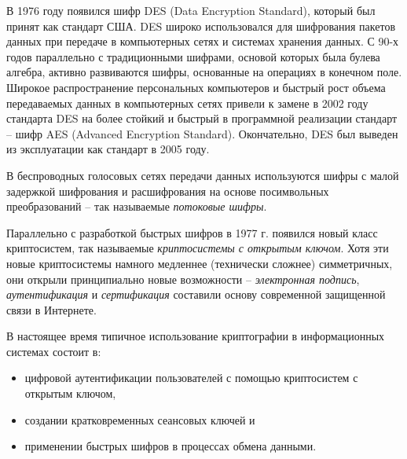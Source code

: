 В 1976 году появился шифр DES (Data Encryption Standard), который был принят как стандарт США. DES широко использовался для шифрования пакетов данных при передаче в компьютерных сетях и системах хранения данных. С 90-х годов параллельно с традиционными шифрами, основой которых была булева алгебра, активно развиваются шифры, основанные на операциях в конечном поле. Широкое распространение персональных компьютеров и быстрый рост объема передаваемых данных в компьютерных сетях привели к замене в 2002 году стандарта DES на более стойкий и быстрый в программной реализации стандарт -- шифр AES (Advanced Encryption Standard). Окончательно, DES был выведен из эксплуатации как стандарт в 2005 году.

В беспроводных голосовых сетях передачи данных используются шифры с малой задержкой шифрования и расшифрования на основе посимвольных преобразований -- так называемые \emph{потоковые шифры}.


Параллельно с разработкой быстрых шифров в 1977 г. появился новый класс криптосистем, так называемые \emph{криптосистемы с открытым ключом}. Хотя эти новые криптосистемы намного медленнее (технически сложнее) симметричных, они открыли принципиально новые возможности --  \emph{электронная подпись}, \emph{аутентификация} и \emph{сертификация} составили основу современной защищенной связи в Интернете.

В настоящее время типичное использование криптографии в информационных системах состоит в:
\begin{itemize}
\item цифровой аутентификации пользователей с помощью криптосистем с открытым ключом,
\item создании кратковременных сеансовых ключей и
\item применении быстрых шифров в процессах обмена данными.
\end{itemize}
